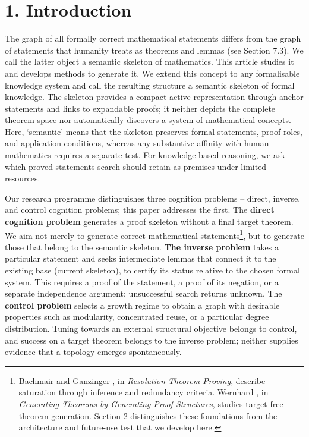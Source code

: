 \documentclass[pdflatex,sn-basic,Numbered]{sn-jnl}
\begin{document}
\section*{1. Introduction}\label{introduction}

The graph of all formally correct mathematical statements differs from the graph of statements that humanity treats as theorems and lemmas \citep{MetamathSetMMPinned} (see Section 7.3). We call the latter object a semantic skeleton of mathematics. This article studies it and develops methods to generate it. We extend this concept to any formalisable knowledge system and call the resulting structure a semantic skeleton of formal knowledge. The skeleton provides a compact active representation through anchor statements and links to expandable proofs; it neither depicts the complete theorem space nor automatically discovers a system of mathematical concepts. Here, `semantic' means that the skeleton preserves formal statements, proof roles, and application conditions, whereas any substantive affinity with human mathematics requires a separate test. For knowledge-based reasoning, we ask which proved statements search should retain as premises under limited resources.

Our research programme distinguishes three cognition problems -- direct, inverse, and control cognition problems; this paper addresses the first. The \textbf{direct cognition problem} generates a proof skeleton without a final target theorem. We aim not merely to generate correct mathematical statements\footnote{Bachmair and Ganzinger \citep{BachmairGanzinger2001}, in \emph{Resolution Theorem Proving}, describe saturation through inference and redundancy criteria. Wernhard \citep{Wernhard2026}, in \emph{Generating Theorems by Generating Proof Structures}, studies target-free theorem generation. Section 2 distinguishes these foundations from the architecture and future-use test that we develop here.}, but to generate those that belong to the semantic skeleton. \textbf{The inverse problem} takes a particular statement and seeks intermediate lemmas that connect it to the existing base (current skeleton), to certify its status relative to the chosen formal system. This requires a proof of the statement, a proof of its negation, or a separate independence argument; unsuccessful search returns unknown. The \textbf{control problem} selects a growth regime to obtain a graph with desirable properties such as modularity, concentrated reuse, or a particular degree distribution. Tuning towards an external structural objective belongs to control, and success on a target theorem belongs to the inverse problem; neither supplies evidence that a topology emerges spontaneously.
\end{document}
